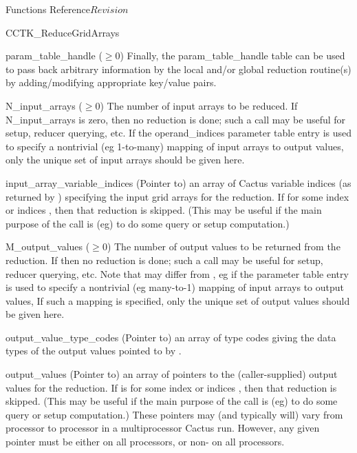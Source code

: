 \begin{cactuspart}{ Functions Reference}{}{$Revision$}
\begin{FunctionDescription}{CCTK\_ReduceGridArrays}
\begin{ParameterSection}
\begin{Parameter}{param\_table\_handle ($\ge 0$)}
Finally, the  param\_table\_handle  table can be used to pass back arbitrary
information by the local and/or global reduction routine(s) by
adding/modifying appropriate key/value pairs.
\end{Parameter}
\begin{Parameter}{N\_input\_arrays ($\ge 0$)}
The number of input arrays to be reduced.  If  N\_input\_arrays is zero,
then no reduction is done; such a call may be useful for setup,
reducer querying, etc.  If the  operand\_indices  parameter table
entry is used to specify a nontrivial (eg 1-to-many) mapping of input
arrays to output values, only the unique set of input arrays should
be given here.
\end{Parameter}
\begin{Parameter}{input\_array\_variable\_indices}
(Pointer to) an array of    Cactus variable indices
(as returned by   ) specifying the input grid arrays
for the reduction.  If  \newline {}
for some index or indices   , then that reduction is skipped.
(This may be useful if the main purpose of the call is (eg) to do
some query or setup computation.)
\end{Parameter}
\begin{Parameter}{M\_output\_values ($\ge 0$)}
The number of output values to be returned from the reduction.
If   then no reduction is done; such a call
may be useful for setup, reducer querying, etc.  Note that
  may differ from   , eg if the
  parameter table entry is used to specify a
nontrivial (eg many-to-1) mapping of input arrays to output values,
If such a mapping is specified, only the unique set of output values
should be given here.
\end{Parameter}
\begin{Parameter}{output\_value\_type\_codes}
(Pointer to) an array of     type
codes giving the data types of the output values pointed to by
.
\end{Parameter}
\begin{Parameter}{output\_values}
(Pointer to) an array of    pointers to the
(caller-supplied) output values for the reduction.
If   is  for some index or indices   ,
then that reduction is skipped.  (This may be useful if the main
purpose of the call is (eg) to do some query or setup computation.)
These pointers may (and typically will) vary from processor to
processor in a multiprocessor Cactus run.  However, any given pointer
must be either  on all processors, or non- on all processors.
\end{Parameter}
\end{ParameterSection}


\end{FunctionDescription}
\end{cactuspart}
